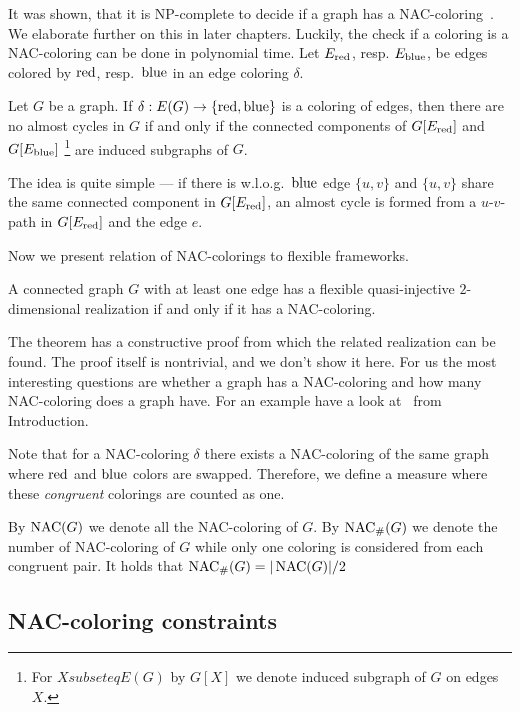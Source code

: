 It was shown, that it is NP-complete to decide if a graph has a NAC-coloring~\cite{np_complete}.
We elaborate further on this in later chapters.
Luckily, the check if a coloring is a NAC-coloring can be done in polynomial time.
Let \( E_{\text{red}}\), resp. \( E_{\text{blue}} \), be edges colored by \( \text{red} \), resp.~\( \text{blue} \)
in an edge coloring \( \delta \).
%
\begin{lemma}
	Let \( G \) be a graph. If \( \delta: E(G) \to \{ \text{red}, \text{blue} \} \) is a coloring of edges,
	then there are no almost cycles in \( G \) if and only if the connected components
	of \( G[E_{\text{red}}] \) and \( G[E_{\text{blue}}] \)%
	\footnote{For \(X subseteq E(G)\) by \(G[X]\) we denote induced subgraph of \( G \) on edges \( X \).}
	are induced subgraphs of \( G \).
\end{lemma}
%
The idea is quite simple --- if there is w.l.o.g.\ \( \text{blue} \) edge \( \{u, v\} \)
and \( \{u, v\} \) share the same connected component in \( G[E_{\text{red}}] \),
an almost cycle is formed from a \( u \)-\( v \)-path in \( G[E_{\text{red}}] \)
and the edge \( e \).

Now we present relation of NAC-colorings to flexible frameworks.
%
\begin{theorem}
	A connected graph \( G \) with at least one edge has a flexible
	quasi-injective \( 2 \)-dimensional realization if and only if it has a NAC-coloring.
\end{theorem}
%
The theorem has a constructive proof from which the related realization can be found.
The proof itself is nontrivial, and we don't show it here.
For us the most interesting questions are whether a graph has a NAC-coloring
and how many NAC-coloring does a graph have.
For an example have a look at~
from Introduction.

Note that for a NAC-coloring \( \delta \) there exists a NAC-coloring of the same
graph where \( \text{red} \) and \( \text{blue} \) colors are swapped.
Therefore, we define a measure where these \emph{congruent} colorings are
counted as one.
%
\begin{definition}
	By \( \operatorname{NAC}(G) \) we denote all the NAC-coloring of \( G \).
	By \( \operatorname{NAC}_{\#} (G) \) we denote the number of NAC-coloring of \( G \)
	while only one coloring is considered from each congruent pair.
	It holds that \( \operatorname{NAC}_{\#} (G) = | \operatorname{NAC}(G) | / 2 \)
\end{definition}
%

\subsection{NAC-coloring constraints}

